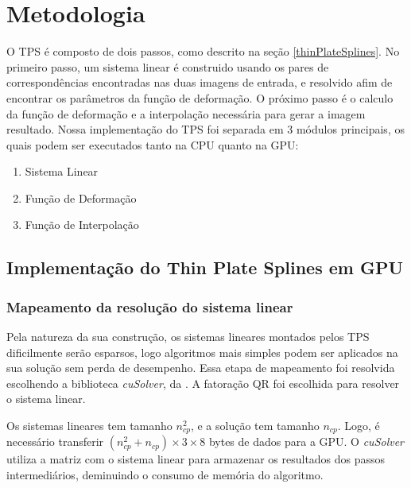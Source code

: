 \chapter{Metodologia}
\label{cap:metodologia}

  O TPS é composto de dois passos, como descrito na seção \ref{thinPlateSplines}.
No primeiro passo, um sistema linear é construido usando os pares de correspondências
encontradas nas duas imagens de entrada, e resolvido afim de encontrar os parâmetros
da função de deformação. O próximo passo é o calculo da função de deformação e
a interpolação necessária para gerar a imagem resultado. Nossa implementação
do TPS foi separada em 3 módulos principais, os quais podem ser executados tanto
na CPU quanto na GPU:

\begin{enumerate}
  \item Sistema Linear
  \item Função de Deformação
  \item Função de Interpolação
\end{enumerate}

\section{Implementação do Thin Plate Splines em GPU}

\subsection{Mapeamento da resolução do sistema linear}

  Pela natureza da sua construção, os sistemas lineares montados pelos TPS dificilmente
serão esparsos, logo algoritmos mais simples podem ser aplicados na sua solução
sem perda de desempenho. Essa etapa de mapeamento foi resolvida escolhendo a
biblioteca \textit{cuSolver}, da \cite{cuSolver}. A fatoração QR foi escolhida
para resolver o sistema linear.

  Os sistemas lineares tem tamanho $n_{cp}^2$, e a solução tem tamanho $n_{cp}$.
Logo, é necessário transferir $(n_{cp}^2 + n_{cp}) \times 3 \times 8$ bytes de
dados para a GPU. O \textit{cuSolver} utiliza a matriz com o sistema linear para
armazenar os resultados dos passos intermediários, deminuindo o consumo de memória
do algoritmo.

